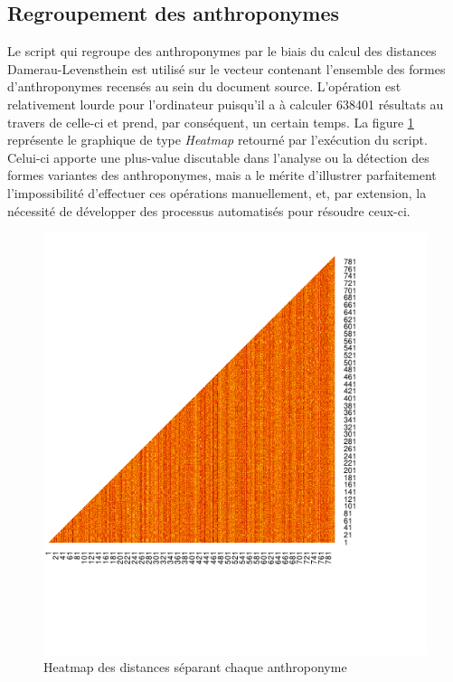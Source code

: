\subsection{Regroupement des anthroponymes}
Le script qui regroupe des anthroponymes par le biais du calcul des distances Damerau-Levensthein est utilisé sur le vecteur contenant l'ensemble des formes d'anthroponymes recensés au sein du document source. L'opération est relativement lourde pour l'ordinateur puisqu'il a à calculer 638401 résultats au travers de celle-ci et prend, par conséquent, un certain temps. La figure \ref{heatmap_anthro} représente le graphique de type \textit{Heatmap} retourné par l'exécution du script. Celui-ci apporte une plus-value discutable dans l'analyse ou la détection des formes variantes des anthroponymes, mais a le mérite d'illustrer parfaitement l'impossibilité d'effectuer ces opérations manuellement, et, par extension, la nécessité de développer des processus automatisés pour résoudre ceux-ci.
\begin{figure}
    \centering
    \includegraphics [scale=2]{3.Results/Img/heatmap.pdf}
    \caption{Heatmap des distances séparant chaque anthroponyme}
    \label{heatmap_anthro}
\end{figure}


